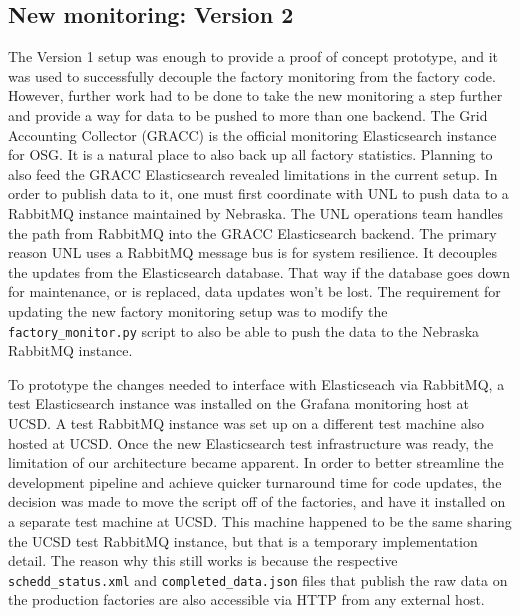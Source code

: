 \documentclass{webofc}
\begin{document}
\subsection{New monitoring: Version 2}
\label{arch-post}
The Version 1 setup was enough to provide a proof of concept prototype, and it was used to successfully decouple the factory monitoring from the factory code. However, further work had to be done to take the new monitoring a step further and provide a way for data to be pushed to more than one backend. The Grid Accounting Collector (GRACC) \cite{gracc} is the official monitoring Elasticsearch instance for OSG. It is a natural place to also back up all factory statistics. Planning to also feed the GRACC Elasticsearch revealed limitations in the current setup. In order to publish data to it, one must first coordinate with UNL to push data to a RabbitMQ \cite{rabbitmq} instance maintained by Nebraska. The UNL operations team handles the path from RabbitMQ into the GRACC Elasticsearch backend. The primary reason UNL uses a RabbitMQ message bus is for system resilience. It decouples the updates from the Elasticsearch database. That way if the database goes down for maintenance, or is replaced, data updates won't be lost. The requirement for updating the new factory monitoring setup was to modify the \verb"factory_monitor.py" script to also be able to push the data to the Nebraska RabbitMQ instance.

To prototype the changes needed to interface with Elasticseach via RabbitMQ, a test Elasticsearch instance was installed on the Grafana monitoring host at UCSD. A test RabbitMQ instance was set up on a different test machine also hosted at UCSD. Once the new Elasticsearch test infrastructure was ready, the limitation of our architecture became apparent. In order to better streamline the development pipeline and achieve quicker turnaround time for code updates, the decision was made to move the script off of the factories, and have it installed on a separate test machine at UCSD. This machine happened to be the same sharing the UCSD test RabbitMQ instance, but that is a temporary implementation detail. The reason why this still works is because the respective \verb"schedd_status.xml" and \verb"completed_data.json" files that publish the raw data on the production factories are also accessible via HTTP from any external host.
\end{document}
